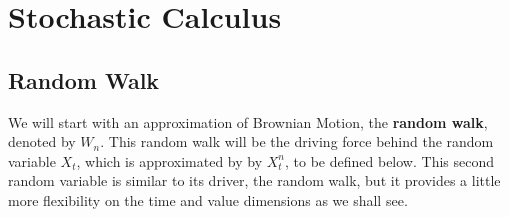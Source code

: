 \documentclass[12pt]{article}
\theoremstyle{plain}
\theoremstyle{definition}
\theoremstyle{remark}
\begin{document}




\clearpage
\section{Stochastic Calculus}

\subsection{Random Walk}

We will start with an approximation of Brownian Motion, the
\textbf{random walk}, denoted by $W_n$.  This random walk will be the
driving force behind the random variable $X_t$, which is approximated by
by $X^n_t$, to be defined below.  This second random variable is
similar to its driver, the random walk, but it provides a little more
flexibility on the time and value dimensions as we shall see.
\end{document}

